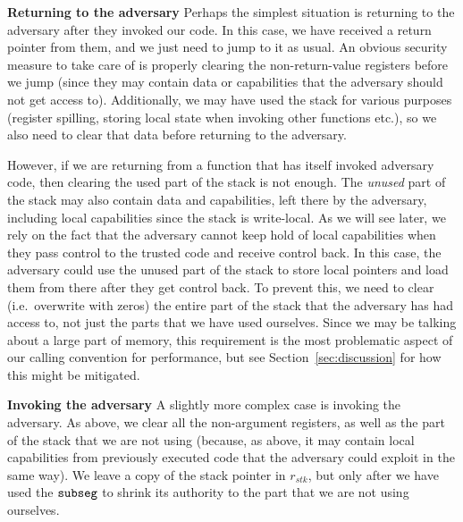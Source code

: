 \documentclass[compsoc,conference,letterpaper,fleqn]{IEEEtran}
\newcommand{\var}[1]{\mathit{#1}}
\newcommand{\stk}{\var{stk}}
\newcommand{\zinstr}[1]{\mathtt{#1}}
\newcommand{\threeinstr}[4]{
  \ifthenelse{\equal{#2#3#4}{}}
  {\zinstr{#1}}
  {\zinstr{#1} \; #2 \; #3 \; #4}
}
\newcommand{\subseg}[3]{\threeinstr{subseg}{#1}{#2}{#3}}
\begin{document}
\textbf{Returning to the adversary} Perhaps the simplest situation is returning
to the adversary after they invoked our code. In this case, we have received a
return pointer from them, and we just need to jump to it as usual. An obvious
security measure to take care of is properly clearing the non-return-value
registers before we jump (since they may contain data or capabilities that the
adversary should not get access to). Additionally, we may have used the stack
for various purposes (register spilling, storing local state when invoking other
functions etc.), so we also need to clear that data before returning to the
adversary.

However, if we are returning from a function that has itself invoked adversary
code, then clearing the used part of the stack is not enough. The \emph{unused}
part of the stack may also contain data and capabilities, left there by the
adversary, including local capabilities since the stack is write-local. As we
will see later, we rely on the fact that the adversary cannot keep hold of local
capabilities when they pass control to the trusted code and receive control
back. In this case, the adversary could use the unused part of the stack to
store local pointers and load them from there after they get control back. To
prevent this, we need to clear (i.e.\ overwrite with zeros) the entire part of
the stack that the adversary has had access to, not just the parts that we have
used ourselves. Since we may be talking about a large part of memory, this
requirement is the most problematic aspect of our calling convention for
performance, but see Section~\ref{sec:discussion} for how this might be
mitigated.

\textbf{Invoking the adversary} A slightly more complex case is invoking the
adversary. As above, we clear all the non-argument registers, as well as the
part of the stack that we are not using (because, as above, it may contain local
capabilities from previously executed code that the adversary could exploit in
the same way). We leave a copy of the stack pointer in $r_\stk$, but only after
we have used the $\subseg{}{}{}$ to shrink its authority to the part that we are
not using ourselves.
\end{document}
